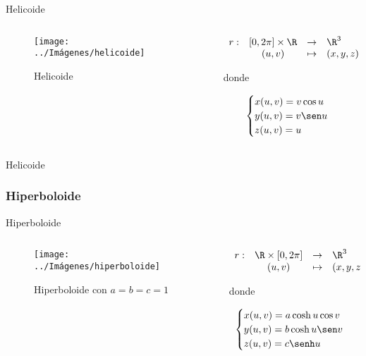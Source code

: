 \documentclass[10pt]{beamer}
\begin{document}
	\begin{frame}{Helicoide}
		\begin{columns}[t] %
			\begin{column}{.50\textwidth}
				\begin{figure}
					\centering
					\texttt{[image: ../Imágenes/helicoide]}
					\caption{Helicoide}
					\label{fig:helicoide}
				\end{figure}
			\end{column}%
			\hfill%
			\begin{column}{.50\textwidth}
				$$\begin{array}{rcll}
				r : & [0, 2\pi] \times \R & \to & \R^3\\
				& (u,v) & \mapsto & (x,y,z)
				\end{array}$$
				
				donde 
				
				$$ \begin{cases}
				x(u,v) = v\cos u \\
				y(u,v) = v\sen u \\
				z(u,v) = u
				\end{cases} $$
			\end{column}%
		\end{columns}
	\end{frame}
	
	\begin{frame}{Helicoide}
	\end{frame}
	
	\subsubsection{Hiperboloide}
	
	\begin{frame}{Hiperboloide}
		\begin{columns}[t] %
			\begin{column}{.50\textwidth}
				\begin{figure}
					\centering
					\texttt{[image: ../Imágenes/hiperboloide]}
					\caption{Hiperboloide con $a=b=c=1$}
					\label{fig:hiperboloide}
				\end{figure}
			\end{column}%
			\hfill%
			\begin{column}{.50\textwidth}
				$$\begin{array}{rcll}
				r : & \R \times [0, 2\pi] & \to & \R^3\\
				& (u,v) & \mapsto & (x,y,z)
				\end{array}$$
				
				donde 
				
				$$ \begin{cases}
				x(u,v) = a \cosh u \cos v \\
				y(u,v) = b \cosh u \sen v \\
				z(u,v) = c \senh u
				\end{cases} $$
			\end{column}%
		\end{columns}
	\end{frame}
	
\end{document}
